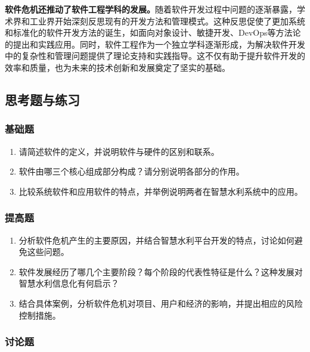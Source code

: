 \textbf{软件危机还推动了软件工程学科的发展。}随着软件开发过程中问题的逐渐暴露，学术界和工业界开始深刻反思现有的开发方法和管理模式。这种反思促使了更加系统和标准化的软件开发方法的诞生，如面向对象设计、敏捷开发、DevOps等方法论的提出和实践应用。同时，软件工程作为一个独立学科逐渐形成，为解决软件开发中的复杂性和管理问题提供了理论支持和实践指导。这不仅有助于提升软件开发的效率和质量，也为未来的技术创新和发展奠定了坚实的基础。

\subsection{思考题与练习}\label{ux601dux8003ux9898ux4e0eux7ec3ux4e60}

\subsubsection{基础题}\label{ux57faux7840ux9898}

\begin{enumerate}
\def\labelenumi{\arabic{enumi}.}
\tightlist
\item
  请简述软件的定义，并说明软件与硬件的区别和联系。
\item
  软件由哪三个核心组成部分构成？请分别说明各部分的作用。
\item
  比较系统软件和应用软件的特点，并举例说明两者在智慧水利系统中的应用。
\end{enumerate}

\subsubsection{提高题}\label{ux63d0ux9ad8ux9898}

\begin{enumerate}
\def\labelenumi{\arabic{enumi}.}
\setcounter{enumi}{3}
\tightlist
\item
  分析软件危机产生的主要原因，并结合智慧水利平台开发的特点，讨论如何避免这些问题。
\item
  软件发展经历了哪几个主要阶段？每个阶段的代表性特征是什么？这种发展对智慧水利信息化有何启示？
\item
  结合具体案例，分析软件危机对项目、用户和经济的影响，并提出相应的风险控制措施。
\end{enumerate}

\subsubsection{讨论题}\label{ux8ba8ux8bbaux9898}

